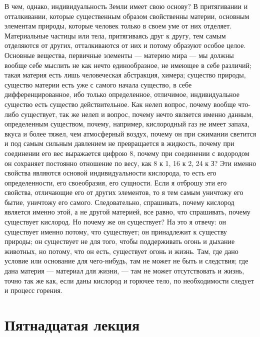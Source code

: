 \documentclass[12pt]{article}
\begin{document}
В чем, однако, индивидуальность Земли имеет свою основу? В притягивании и отталкивании, которые существенным образом свойственны материи, основным элементам природы, которые человек только в своем уме от них отделяет. Материальные частицы или тела, притягиваясь друг к другу, тем самым отделяются от других, отталкиваются от них и потому образуют особое целое. Основные вещества, первичные элементы --- материю мира --- мы должны вообще себе мыслить не как нечто единообразное, не имеющее в себе различий; такая материя есть лишь человеческая абстракция, химера; существо природы, существо материи есть уже с самого начала существо, в себе дифференцированное, ибо только определенное, отличимое, индивидуальное существо есть существо действительное. Как нелеп вопрос, почему вообще что-либо существует, так же нелеп и вопрос, почему нечто является именно данным, определенным существом, почему, например, кислородный газ не имеет запаха, вкуса и более тяжел, чем атмосферный воздух, почему он при сжимании светится и под самым сильным давлением не превращается в жидкость, почему при соединении его вес выражается цифрою 8, почему при соединении с водородом он сохраняет постоянно отношение по весу, как 8 к 1, 16 к 2, 24 к З? Эти именно свойства являются основой индивидуальности кислорода, то есть его определенности, его своеобразия, его сущности. Если я отброшу эти его свойства, отличающие его от других элементов, то я тем самым уничтожу его бытие, уничтожу его самого. Следовательно, спрашивать, почему кислород является именно этой, а не другой материей, все равно, что спрашивать, почему существует кислород. Но почему же он существует? На это я отвечу: он существует именно потому, что существует; он принадлежит к существу природы; он существует не для того, чтобы поддерживать огонь и дыхание животных, но потому, что он есть, существует огонь и жизнь. Там, где дано условие или основание для чего-нибудь, там не может не быть и следствия; где дана материя --- материал для жизни, --- там не может отсутствовать и жизнь, точно так же как, если даны кислород и горючее тело, по необходимости следует и процесс горения. 

\section*{Пятнадцатая лекция}
\end{document}
